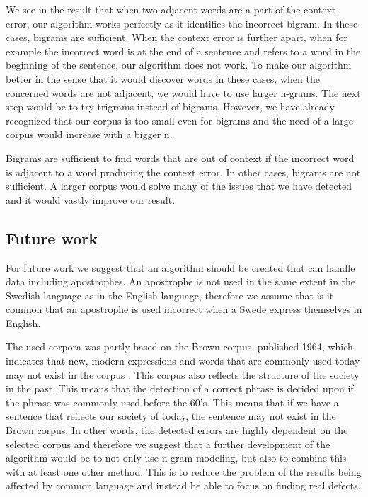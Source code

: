 \documentclass[a4paper,12pt]{article}
\begin{document}
We see in the result that when two adjacent words are a part of the context error, our algorithm works perfectly as it identifies the incorrect bigram. In these cases, bigrams are sufficient. When the context error is further apart, when for example the incorrect word is at the end of a sentence and refers to a word in the beginning of the sentence, our algorithm does not work. To make our algorithm better in the sense that it would discover words in these cases, when the concerned words are not adjacent, we would have to use larger n-grams. The next step would be to try trigrams instead of bigrams. However, we have already recognized that our corpus is too small even for bigrams and the need of a large corpus would increase with a bigger n.

Bigrams are sufficient to find words that are out of context if the incorrect word is adjacent to a word producing the context error. In other cases, bigrams are not sufficient. A larger corpus would solve many of the issues that we have detected and it would vastly improve our result.  

\subsection{Future work}
\label{sec:futurework}
For future work we suggest that an algorithm should be created that can handle data including apostrophes. An apostrophe is not used in the same extent in the Swedish language as in the English language, therefore we assume that is it common that an apostrophe is used incorrect when a Swede express themselves in English. 
 
The used corpora was partly based on the Brown corpus, published 1964, which indicates that new, modern expressions and words that are commonly used today may not exist in the corpus \cite{francis64brown}. This corpus also reflects the structure of the society in the past. This means that the detection of a correct phrase is decided upon if the phrase was commonly used before the 60’s. This means that if we have a sentence that reflects our society of today, the sentence may not exist in the Brown corpus. In other words, the detected errors are highly dependent on the selected corpus and therefore we suggest that a further development of the algorithm would be to not only use n-gram modeling, but also to combine this with at least one other method. This is to reduce the problem of the results being affected by common language and instead be able to focus on finding real defects. 
\end{document}
